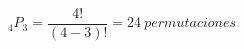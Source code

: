 \documentclass[preview]{standalone}
\begin{document}
\begin{center}
\[{}_4P_3 = \frac{4!}{(4-3)!} = 24 \ permutaciones\]
\end{center}
\end{document}
